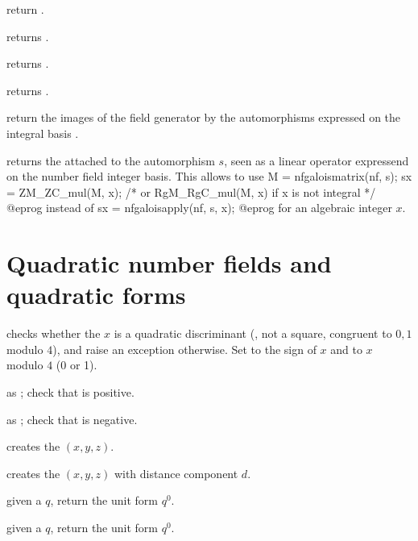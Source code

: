  return .

 returns .

 returns .

 returns .


return the images of the field generator by the automorphisms
 expressed on the integral basis .

 returns the  attached to
the automorphism $s$, seen as a linear operator expressend on the number
field integer basis. This allows to use
\bprog
  M = nfgaloismatrix(nf, s);
  sx = ZM_ZC_mul(M, x);   /* or RgM_RgC_mul(M, x) if x is not integral */
@eprog\noindent
instead of
\bprog
  sx = nfgaloisapply(nf, s, x);
@eprog\noindent
for an algebraic integer $x$.

\section{Quadratic number fields and quadratic forms}


checks whether the  $x$ is a quadratic discriminant (,
not a square, congruent to $0,1$ modulo $4$), and raise an exception
otherwise. Set  to the sign of $x$ and  to $x$ modulo
$4$ (0 or 1).

 as
; check that  is positive.

 as
; check that  is negative.


 creates the  $(x,y,z)$.

 creates the  $(x,y,z)$
with distance component $d$.

 given a  $q$, return the unit form $q^0$.

 given a  $q$, return the unit form $q^0$.

